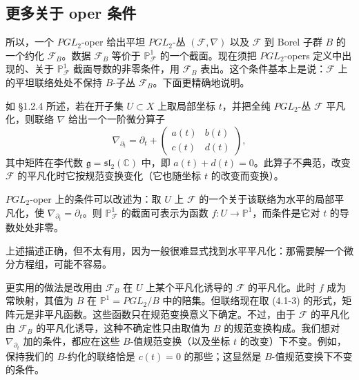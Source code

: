 \subsection{更多关于 oper 条件}

所以，一个 $PGL_2$-oper 给出平坦 $PGL_2$-丛 $(\mathcal{F},\nabla)$ 以及 $\mathcal{F}$ 到 Borel 子群 $B$ 的一个约化 $\mathcal{F}_B$。数据 $\mathcal{F}_B$ 等价于 $\mathbb{P}^1_{\mathcal{F}}$ 的一个截面。现在须把 $PGL_2$-opers 定义中出现的、关于 $\mathbb{P}^1_{\mathcal{F}}$ 截面导数的非零条件，用 $\mathcal{F}_B$ 表出。这个条件基本上是说：$\mathcal{F}$ 上的平坦联络处处不保持 $B$-子丛 $\mathcal{F}_B$。下面更精确地说明。

如 §1.2.4 所述，若在开子集 $U\subset X$ 上取局部坐标 $t$，并把全纯 $PGL_2$-丛 $\mathcal{F}$ 平凡化，则联络 $\nabla$ 给出一个一阶微分算子
\begin{equation}
    \nabla_{\partial_t}=\partial_t+\begin{pmatrix}a(t)&b(t)\\c(t)&d(t)\end{pmatrix},
    \tag{4.1-3}
\end{equation}
其中矩阵在李代数 $\mathfrak{g}=\mathfrak{sl}_2(\mathbb{C})$ 中，即 $a(t)+d(t)=0$。此算子不典范，改变 $\mathcal{F}$ 的平凡化时它按规范变换变化（它也随坐标 $t$ 的改变而变换）。

$PGL_2$-oper 上的条件可以改述为：取 $U$ 上 $\mathcal{F}$ 的一个关于该联络为水平的局部平凡化，使 $\nabla_{\partial_t}=\partial_t$。则 $\mathbb{P}^1_{\mathcal{F}}$ 的截面可表示为函数 $f:U\to\mathbb{P}^1$，而条件是它对 $t$ 的导数处处非零。


上述描述正确，但不太有用，因为一般很难显式找到水平平凡化：那需要解一个微分方程组，可能不容易。

更实用的做法是改用由 $\mathcal{F}_B$ 在 $U$ 上某个平凡化诱导的 $\mathcal{F}$ 的平凡化。此时 $f$ 成为常映射，其值为 $B$ 在 $\mathbb{P}^1=PGL_2/B$ 中的陪集。但联络现在取 (4.1-3) 的形式，矩阵元是非平凡函数。这些函数只在规范变换意义下确定。不过，由于 $\mathcal{F}$ 的平凡化由 $\mathcal{F}_B$ 的平凡化诱导，这种不确定性只由取值为 $B$ 的规范变换构成。我们想对 $\nabla_{\partial_t}$ 加的条件，都应在这些 $B$-值规范变换（以及坐标 $t$ 的改变）下不变。例如，保持我们的 $B$-约化的联络恰是 $c(t)=0$ 的那些；这显然是 $B$-值规范变换下不变的条件。


